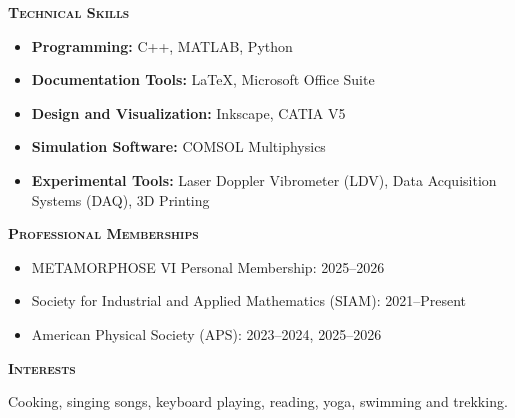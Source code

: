 \documentclass[11pt]{article}
\renewcommand{\section}[1]{%
  \par\vspace{12pt}%
  {\centerline{\large\bfseries\scshape #1}}\par\vspace{-6pt}%
  \noindent{\color{black!20}\rule{\linewidth}{1pt}}\par\vspace{5pt}%
}
\newenvironment{list2}{\begin{itemize}[leftmargin=0.2in,itemsep=0pt,topsep=2pt,parsep=0pt]}{\end{itemize}}
\begin{document}
\section{Technical Skills}
\begin{list2}
\item \textbf{Programming:} C++, MATLAB, Python
\item \textbf{Documentation Tools:} \LaTeX{}, Microsoft Office Suite
\item \textbf{Design and Visualization:} Inkscape, CATIA V5
\item \textbf{Simulation Software:} COMSOL Multiphysics
\item \textbf{Experimental Tools:} Laser Doppler Vibrometer (LDV), Data Acquisition Systems (DAQ), 3D Printing
\end{list2}

\section{Professional Memberships}
\begin{list2}
\item METAMORPHOSE VI Personal Membership: 2025--2026
\item Society for Industrial and Applied Mathematics (SIAM): 2021--Present
\item American Physical Society (APS): 2023--2024, 2025--2026
\end{list2}

\section{Interests}
Cooking, singing songs, keyboard playing, reading, yoga, swimming and trekking.
\end{document}
